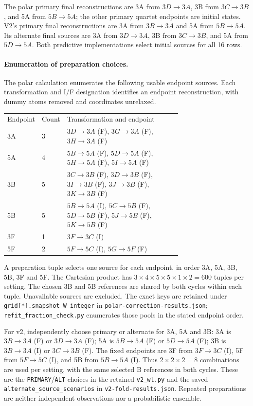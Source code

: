 \documentclass{article}
\begin{document}
The polar primary final reconstructions are 3A from \(3D\to3A\), 3B from \(3C\to3B\), and 5A from \(5B\to5A\); the other primary quartet endpoints are initial states. V2's primary final reconstructions are 3A from \(3B\to3A\) and 5A from \(5B\to5A\). Its alternate final sources are 3A from \(3D\to3A\), 3B from \(3C\to3B\), and 5A from \(5D\to5A\). Both predictive implementations select initial sources for all 16 rows.

\paragraph{Enumeration of preparation choices.}
The polar calculation enumerates the following usable endpoint sources. Each transformation and I/F designation identifies an endpoint reconstruction, with dummy atoms removed and coordinates unrelaxed.
\begin{center}\begin{tabular}{llp{0.71\linewidth}}
Endpoint & Count & Transformation and endpoint \\
3A & 3 & \(3D\to3A\) (F), \(3G\to3A\) (F), \(3H\to3A\) (F) \\
5A & 4 & \(5B\to5A\) (F), \(5D\to5A\) (F), \(5H\to5A\) (F), \(5I\to5A\) (F) \\
3B & 5 & \(3C\to3B\) (F), \(3D\to3B\) (F), \(3I\to3B\) (F), \(3J\to3B\) (F), \(3K\to3B\) (F) \\
5B & 5 & \(5B\to5A\) (I), \(5C\to5B\) (F), \(5D\to5B\) (F), \(5J\to5B\) (F), \(5K\to5B\) (F) \\
3F & 1 & \(3F\to3C\) (I) \\
5F & 2 & \(5F\to5C\) (I), \(5G\to5F\) (F) \\
\end{tabular}\end{center}
A preparation tuple selects one source for each endpoint, in order 3A, 5A, 3B, 5B, 3F and 5F. The Cartesian product has \(3\times4\times5\times5\times1\times2=600\) tuples per setting. The chosen 3B and 5B references are shared by both cycles within each tuple. Unavailable sources are excluded. The exact keys are retained under \texttt{grid[*].snapshot\_W\_integer} in \texttt{polar-correction-results.json}; \texttt{refit\_fraction\_check.py} enumerates those pools in the stated endpoint order.

For v2, independently choose primary or alternate for 3A, 5A and 3B: 3A is \(3B\to3A\) (F) or \(3D\to3A\) (F); 5A is \(5B\to5A\) (F) or \(5D\to5A\) (F); 3B is \(3B\to3A\) (I) or \(3C\to3B\) (F). The fixed endpoints are 3F from \(3F\to3C\) (I), 5F from \(5F\to5C\) (I), and 5B from \(5B\to5A\) (I). Thus \(2\times2\times2=8\) combinations are used per setting, with the same selected B references in both cycles. These are the \texttt{PRIMARY}/\texttt{ALT} choices in the retained \texttt{v2\_wl.py} and the saved \texttt{alternate\_source\_scenarios} in \texttt{v2-fold-results.json}. Repeated preparations are neither independent observations nor a probabilistic ensemble.
\end{document}
